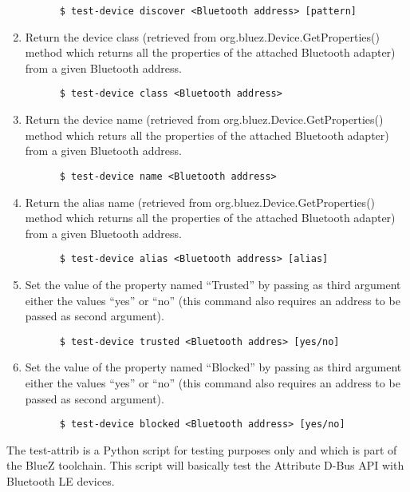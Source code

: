 \documentclass[11pt]{article}
\begin{document}
\begin{enumerate}
\begin{verbatim}
      $ test-device discover <Bluetooth address> [pattern]
    \end{verbatim}
  \item Return the device class (retrieved from
        org.bluez.Device.GetProperties() method which returns all the
        properties of the attached Bluetooth adapter) from a given
        Bluetooth address.
    \begin{verbatim}
      $ test-device class <Bluetooth address>
    \end{verbatim}
  \item Return the device name (retrieved from
        org.bluez.Device.GetProperties() method which returs all the
        properties of the attached Bluetooth adapter) from a given
        Bluetooth address.
    \begin{verbatim}
      $ test-device name <Bluetooth address>
    \end{verbatim}
  \item Return the alias name (retrieved from
        org.bluez.Device.GetProperties() method which returns all the
        properties of the attached Bluetooth adapter) from a given
        Bluetooth address.
    \begin{verbatim}
      $ test-device alias <Bluetooth address> [alias]
    \end{verbatim}
  \item Set the value of the property named ``Trusted'' by passing as
        third argument either the values ``yes'' or ``no''
        (this command also requires an address to be passed as second
         argument).
    \begin{verbatim}
      $ test-device trusted <Bluetooth addres> [yes/no]
    \end{verbatim}
  \item Set the value of the property named ``Blocked'' by passing as
        third argument either the values ``yes'' or ``no''
        (this command also requires an address to be passed as second
         argument).
    \begin{verbatim}
      $ test-device blocked <Bluetooth address> [yes/no]
    \end{verbatim}
\end{enumerate}

The test-attrib is a Python script for testing purposes only and which is part
of the BlueZ toolchain. This script will basically test the Attribute
D-Bus API with Bluetooth LE devices.
\end{document}
